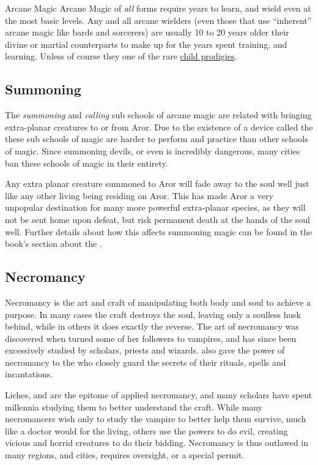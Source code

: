 \begin{35e}{Arcane Magic}
  Arcane Magic of \emph{all} forms require years to learn, and wield even at
  the most basic levels. Any and all arcane wielders (even those that use
  ``inherent'' arcane magic like bards and sorcerers) are usually 10 to 20
  years older their divine or martial counterparts to make up for the years
  spent training, and learning. Unless of course they one of the rare
  \hyperref[sec:Graham Balance]{child prodigies}.
\end{35e}

\subsection{Summoning}
\label{sec:Summoning}

The \emph{summoning} and \emph{calling} sub schools of arcane magic are
related with bringing extra-planar creatures to or from Aror. Due to the
existence of a device called the  these sub schools of
magic are harder to perform and practice than other schools of magic. Since
summoning devils, or even  is incredibly dangerous, many
cities ban these schools of magic in their entirety.

Any extra planar creature summoned to Aror will fade away to the soul well
just like any other living being residing on Aror. This has made Aror a very
unpopular destination for many more powerful extra-planar species, as they
will not be sent home upon defeat, but risk permanent death at the hands of
the soul well. Further details about how this affects summoning magic can
be found in the book's section about the .

\subsection{Necromancy}
\label{sec:Necromancy}

Necromancy is the art and craft of manipulating both body and soul to achieve
a purpose. In many cases the craft destroys the soul, leaving only a soulless
husk behind, while in others it does exactly the reverse. The art of
necromancy was discovered when  turned some of her
followers to vampires, and has since been excessively studied by scholars,
priests and wizards.  also gave the power of necromancy to
the  who closely guard the secrets of their rituals, spells
and incantations.

Liches, and  are the epitome of applied necromancy, and
many scholars have spent millennia studying them to better understand the
craft. While many necromancers wish only to study the vampire to better help
them survive, much like a doctor would for the living, others use the powers to
do evil, creating vicious and horrid creatures to do their bidding. Necromancy
is thus outlawed in many regions, and cities, requires oversight, or a special
permit.






